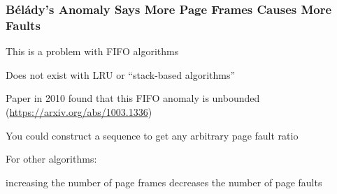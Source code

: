   \begin{frame}
    \frametitle{Bélády's Anomaly Says More Page Frames Causes More Faults}

    This is a problem with FIFO algorithms

    \hspace{2em} Does not exist with LRU or ``stack-based algorithms''

    \vspace{2em}

    Paper in 2010 found that this FIFO anomaly is unbounded (\url{https://arxiv.org/abs/1003.1336})

    \hspace{2em} You could construct a sequence to get any arbitrary page fault ratio

    \vspace{2em}

    For other algorithms:

    \hspace{2em} increasing the number of page frames decreases the number of
    page faults
  \end{frame}

